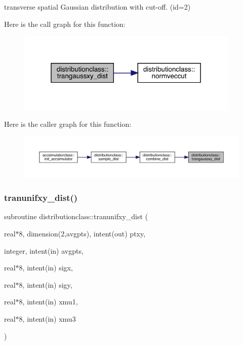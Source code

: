 transverse spatial Gaussian distribution with cut-\/off. (id=2) 

Here is the call graph for this function\+:\nopagebreak
\begin{figure}[H]
\begin{center}
\leavevmode
\includegraphics[width=301pt]{namespacedistributionclass_a42ccdb5100e3e35c9424c89dcac131c1_cgraph}
\end{center}
\end{figure}
Here is the caller graph for this function\+:\nopagebreak
\begin{figure}[H]
\begin{center}
\leavevmode
\includegraphics[width=350pt]{namespacedistributionclass_a42ccdb5100e3e35c9424c89dcac131c1_icgraph}
\end{center}
\end{figure}
\mbox{\label{namespacedistributionclass_aec8b879df17219ee41f1855623176867}} 
\subsubsection{\texorpdfstring{tranunifxy\_dist()}{tranunifxy\_dist()}}
{\footnotesize\ttfamily subroutine distributionclass\+::tranunifxy\+\_\+dist (\begin{DoxyParamCaption}\item[{real$\ast$8, dimension(2,avgpts), intent(out)}]{ptxy,  }\item[{integer, intent(in)}]{avgpts,  }\item[{real$\ast$8, intent(in)}]{sigx,  }\item[{real$\ast$8, intent(in)}]{sigy,  }\item[{real$\ast$8, intent(in)}]{xmu1,  }\item[{real$\ast$8, intent(in)}]{xmu3 }\end{DoxyParamCaption})}



